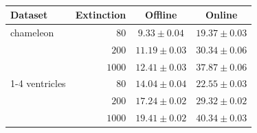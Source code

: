 \begin{table}
    \footnotesize
    \centering
    \caption{\captiontimes{}}
    \label{tab:times}
    \begin{tabular}{lrcc}
        \toprule
        \textbf{Dataset} & \textbf{Extinction} & \textbf{Offline} & \textbf{Online} \\
        \midrule
        \textsf{chameleon} & $80$ & $9.33 \pm 0.04$ & $19.37 \pm 0.03$ \\
         & $200$ & $11.19 \pm 0.03$ & $30.34 \pm 0.06$ \\
         & $1000$ & $12.41 \pm 0.03$ & $37.87 \pm 0.06$ \\
        \cline{1-4}
        \textsf{ventricles} & $80$ & $14.04 \pm 0.04$ & $22.55 \pm 0.03$ \\
         & $200$ & $17.24 \pm 0.02$ & $29.32 \pm 0.02$ \\
         & $1000$ & $19.41 \pm 0.02$ & $40.34 \pm 0.03$ \\
        \bottomrule
    \end{tabular}
\end{table}